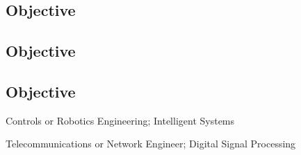 \documentclass[margin]{res}
\begin{document}
 
 
 
\address{{\bf Present Address} \\ 4042 Powelton Avenue \#2 \\ Philadelphia, PA 19104  \\
        (215) 501-7891 }
\address{{\bf Permanent Address} \\ 1726 Reyburn Creek Road \\ Malvern, AR 72104 \\
        (501) 337-8485 }

\begin{resume} 

\begin{controls}
\section{Objective}
\end{controls}
\begin{telecom}
\section{Objective}
\end{telecom}
\begin{educate}
\section{Objective}
\end{educate}


\begin{controls}
Controls or Robotics Engineering; Intelligent Systems
\end{controls}

\begin{telecom}
Telecommunications or Network Engineer; Digital Signal Processing
\end{telecom}


\end{resume}
\end{document}
